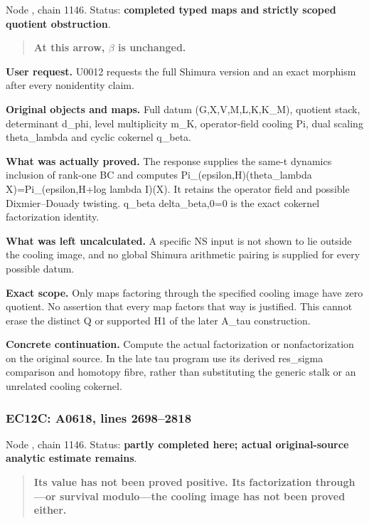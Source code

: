 Node \protect{}, chain 1146.
Status: \textbf{completed typed maps and strictly scoped quotient
obstruction}.

\begin{quote}
\textbf{At this arrow, \(\beta\) is unchanged.}
\end{quote}

\textbf{User request.} U0012 requests the full Shimura version and an
exact morphism after every nonidentity claim.

\textbf{Original objects and maps.} Full datum (G,X,V,M,L,K,K\_M),
quotient stack, determinant d\_phi, level multiplicity m\_K,
operator-field cooling Pi, dual scaling theta\_lambda and cyclic
cokernel q\_beta.

\textbf{What was actually proved.} The response supplies the same-t
dynamics inclusion of rank-one BC and computes
Pi\_(epsilon,H)(theta\_lambda X)=Pi\_(epsilon,H+log lambda I)(X). It
retains the operator field and possible Dixmier--Douady twisting.
q\_beta delta\_beta,0=0 is the exact cokernel factorization identity.

\textbf{What was left uncalculated.} A specific NS input is not shown to
lie outside the cooling image, and no global Shimura arithmetic pairing
is supplied for every possible datum.

\textbf{Exact scope.} Only maps factoring through the specified cooling
image have zero quotient. No assertion that every map factors that way
is justified. This cannot erase the distinct Q or supported H1 of the
later A\_tau construction.

\textbf{Concrete continuation.} Compute the actual factorization or
nonfactorization on the original source. In the late tau program use its
derived res\_sigma comparison and homotopy fibre, rather than
substituting the generic stalk or an unrelated cooling cokernel.

\subsubsection{EC12C: A0618, lines
2698--2818}\label{TranscriptLedgerStage:ec12c-a0618-lines-26982818}

Node \protect{}, chain 1146.
Status: \textbf{partly completed here; actual original-source analytic
estimate remains}.

\begin{quote}
\textbf{Its value has not been proved positive. Its factorization
through---or survival modulo---the cooling image has not been proved
either.}
\end{quote}


